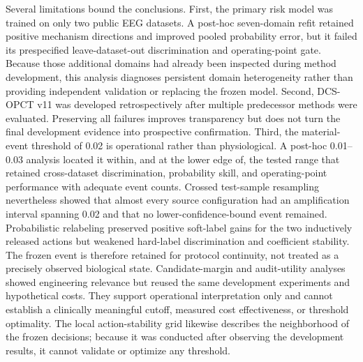 \documentclass[preprint,12pt]{elsarticle}
\begin{document}
Several limitations bound the conclusions. First, the primary risk model was trained on only two public EEG datasets. A post-hoc seven-domain refit retained positive mechanism directions and improved pooled probability error, but it failed its prespecified leave-dataset-out discrimination and operating-point gate. Because those additional domains had already been inspected during method development, this analysis diagnoses persistent domain heterogeneity rather than providing independent validation or replacing the frozen model. Second, DCS-OPCT v11 was developed retrospectively after multiple predecessor methods were evaluated. Preserving all failures improves transparency but does not turn the final development evidence into prospective confirmation. Third, the material-event threshold of 0.02 is operational rather than physiological. A post-hoc 0.01--0.03 analysis located it within, and at the lower edge of, the tested range that retained cross-dataset discrimination, probability skill, and operating-point performance with adequate event counts. Crossed test-sample resampling nevertheless showed that almost every source configuration had an amplification interval spanning 0.02 and that no lower-confidence-bound event remained. Probabilistic relabeling preserved positive soft-label gains for the two inductively released actions but weakened hard-label discrimination and coefficient stability. The frozen event is therefore retained for protocol continuity, not treated as a precisely observed biological state. Candidate-margin and audit-utility analyses showed engineering relevance but reused the same development experiments and hypothetical costs. They support operational interpretation only and cannot establish a clinically meaningful cutoff, measured cost effectiveness, or threshold optimality. The local action-stability grid likewise describes the neighborhood of the frozen decisions; because it was conducted after observing the development results, it cannot validate or optimize any threshold.
\end{document}
